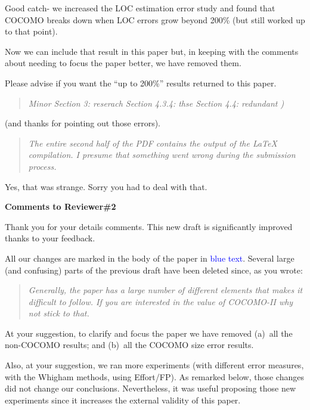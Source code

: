 \documentclass[smallcondesed]{svjour3}
\begin{document}
\noindent Good catch- we increased the LOC estimation error study and found that
COCOMO breaks down when LOC errors grow beyond 200\% (but still worked up
to that point).

  Now we can include that result in this paper but, in keeping with the comments
about needing to focus the paper better, we have removed them.

 Please advise if you want the ``up to 200\%'' results returned to this paper.

\begin{quote}{\em Minor\newline
Section 3: reserach\newline
Section 4.3.4: thse\newline
Section 4.4: redundant )}\end{quote}

\noindent (and thanks for pointing out those errors).


\begin{quote}{\em The entire second half of the PDF contains the output of the LaTeX compilation. I presume that something went wrong during the submission process.}\end{quote}

\noindent Yes, that was strange. Sorry you had to deal with that.

\noindent
{\bf Comments to Reviewer\#2}

\noindent
Thank you for your details comments.  This new draft
is significantly improved thanks to your  feedback. 

All our changes are marked in the body of the paper in \textcolor{blue}{blue text}.
Several large (and confusing) parts of the previous draft have been deleted since,
as you wrote:

\begin{quote}{\em  Generally, the paper has a large number of different elements  that makes it difficult to follow. If you are interested in the value of COCOMO-II why not stick to that.
}\end{quote}

At your suggestion, to clarify and focus the paper we have removed (a)~all the non-COCOMO results;
and (b)~all the COCOMO size error results.

Also, at your suggestion, we ran more experiments (with different error measures,
with the Whigham methods, using Effort/FP). As remarked below, those
changes did not change our conclusions. Nevertheless, it was useful proposing
those new experiments since it increases the external validity of this paper.
\end{document}
